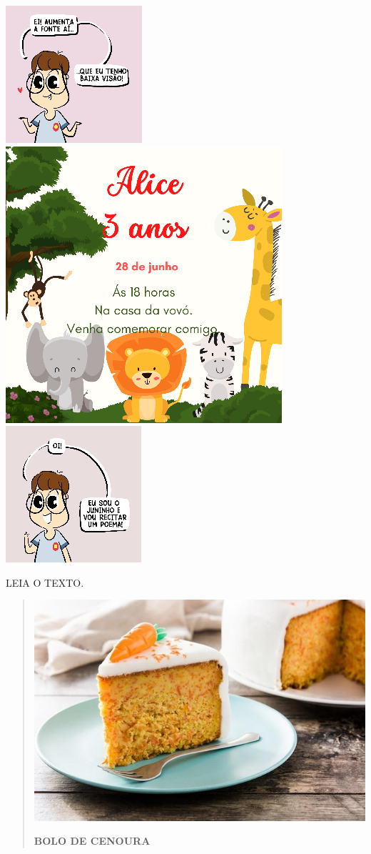 \includegraphics[width=.3\textwidth]{media/image145.png}
\includegraphics[width=.3\textwidth]{media/image147.png}
\includegraphics[width=.3\textwidth]{media/image152.png}

\bigskip
LEIA O TEXTO.

\begin{quote}
\includegraphics[width=.8\textwidth]{media/image153.jpg}

\textbf{BOLO DE CENOURA}
\end{quote}

